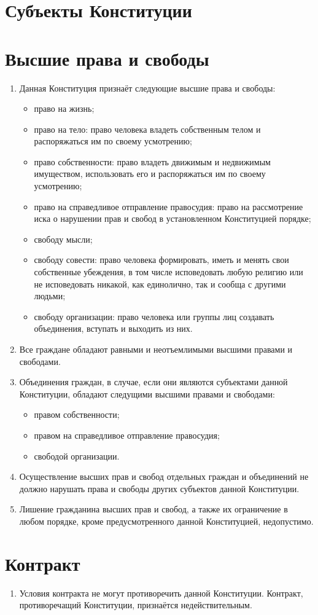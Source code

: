 
\section{Субъекты Конституции} %

\section{Высшие права и свободы}
\begin{enumerate}
    \item Данная Конституция признаёт следующие высшие права и свободы:
    \begin{itemize}
        \item право на жизнь;
         \item право на тело: право человека владеть собственным телом и распоряжаться им по своему усмотрению;
         \item право собственности: право владеть движимым и недвижимым имуществом, использовать его и распоряжаться им по своему усмотрению;
         \item право на справедливое отправление правосудия: право на рассмотрение иска о нарушении прав и свобод в установленном Конституцией порядке;
         \item свободу мысли;
         \item свободу совести: право человека формировать, иметь и менять свои собственные убеждения, в том числе исповедовать любую религию или не исповедовать никакой, как единолично, так и сообща с другими людьми;
         \item свободу организации: право человека или группы лиц создавать объединения, вступать и выходить из них.
    \end{itemize}
    \item Все граждане обладают равными и неотъемлимыми высшими правами и свободами.
    \item Объединения граждан, в случае, если они являются субъектами данной Конституции, обладают следущими высшими правами и свободами:
    \begin{itemize}
        \item правом собственности;
        \item правом на справедливое отправление правосудия;
        \item свободой организации.
    \end{itemize}
    \item Осуществление высших прав и свобод отдельных граждан и объединений не должно нарушать права и свободы других субъектов данной Конституции. 
    \item Лишение гражданина высших прав и свобод, а также их ограничение в любом порядке, кроме предусмотренного данной Конституцией, недопустимо. 
    
    
\end{enumerate}
\section{Контракт}
\begin{enumerate}
    
    
    
    
    \item Условия контракта не могут противоречить данной Конституции. Контракт, противоречащий Конституции, признаётся недействительным.
\end{enumerate}
